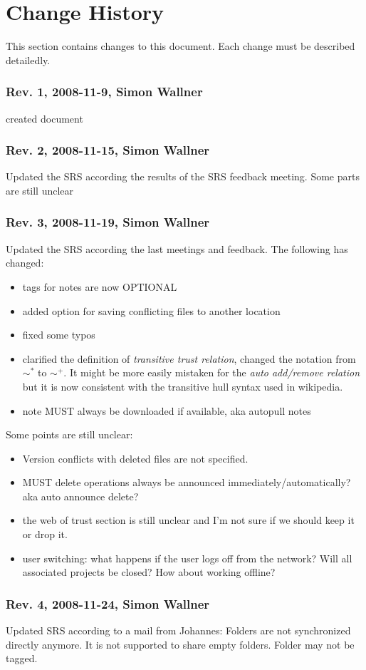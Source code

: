 \section{Change History}
This section contains changes to this document. Each change must be described detailedly.
\subsubsection{Rev. 1, 2008-11-9, Simon Wallner}
created document

\subsubsection{Rev. 2, 2008-11-15, Simon Wallner}
Updated the SRS according the results of the SRS feedback meeting. Some parts are still unclear

\subsubsection{Rev. 3, 2008-11-19, Simon Wallner}
Updated the SRS according the last meetings and feedback. The following has changed: 

\begin{itemize}
\item tags for notes are now OPTIONAL
\item added option for saving conflicting files to another location
\item fixed some typos
\item clarified the definition of \emph{transitive trust relation}, changed the notation from $\sim ^*$ to $\sim ^+$. It might be more easily mistaken for the \emph{auto add/remove relation} but it is now consistent with the transitive hull syntax used in wikipedia.
\item note MUST always be downloaded if available, aka autopull notes 
\end{itemize}
Some points are still unclear:
\begin{itemize}
\item Version conflicts with deleted files are not specified.
\item MUST delete operations always be announced immediately/automatically? aka auto announce delete?
\item the web of trust section is still unclear and I'm not sure if we should keep it or drop it.
\item user switching: what happens if the user logs off from the network? Will all associated projects be closed? How about working offline?
\end{itemize}


\subsubsection{Rev. 4, 2008-11-24, Simon Wallner}
Updated SRS according to a mail from Johannes: Folders are not synchronized directly anymore. It is not supported to share empty folders. Folder may not be tagged.




